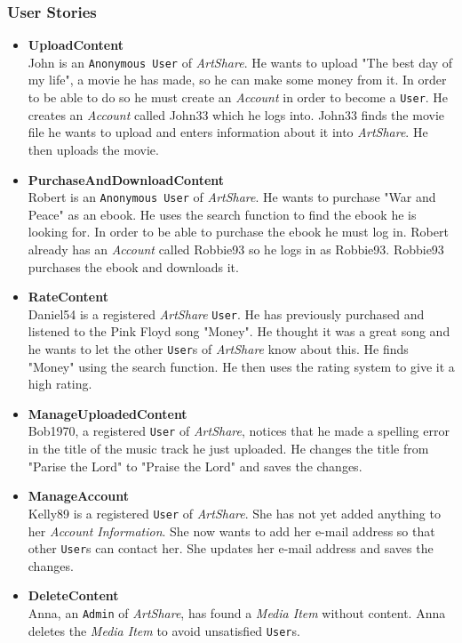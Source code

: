 \subsubsection{User Stories}
\label{sec:User Stories}
\begin{itemize}
\item \textbf{UploadContent} \\
John is an \texttt{Anonymous User} of \textit{ArtShare}. He wants to upload "The best day of my life", a movie he has made, so he can make some money from it. In order to be able to do so he must create an \textit{Account} in order to become a \texttt{User}. He creates an \textit{Account} called John33 which he logs into. John33 finds the movie file he wants to upload and enters information about it into \textit{ArtShare}. He then uploads the movie.
\item \textbf{PurchaseAndDownloadContent} \\
Robert is an \texttt{Anonymous User} of \textit{ArtShare}. He wants to purchase "War and Peace" as an ebook. He uses the search function to find the ebook he is looking for. In order to be able to purchase the ebook he must log in. Robert already has an \textit{Account} called Robbie93 so he logs in as Robbie93. Robbie93 purchases the ebook and downloads it.
\item \textbf{RateContent} \\
Daniel54 is a registered \textit{ArtShare} \texttt{User}. He has previously purchased and listened to the Pink Floyd song "Money". He thought it was a great song and he wants to let the other \texttt{User}s of \textit{ArtShare} know about this. He finds "Money" using the search function. He then uses the rating system to give it a high rating.
\item \textbf{ManageUploadedContent} \\
Bob1970, a registered \texttt{User} of \textit{ArtShare}, notices that he made a spelling error in the title of the music track he just uploaded. He changes the title from "Parise the Lord" to "Praise the Lord" and saves the changes.
\item \textbf{ManageAccount} \\
Kelly89 is a registered \texttt{User} of \textit{ArtShare}. She has not yet added anything to her \textit{Account Information}. She now wants to add her e-mail address so that other \texttt{User}s can contact her. She updates her e-mail address and saves the changes.
\item \textbf{DeleteContent} \\
Anna, an \texttt{Admin} of \textit{ArtShare}, has found a \textit{Media Item} without content. Anna deletes the \textit{Media Item} to avoid unsatisfied \texttt{User}s.
\end{itemize}

%